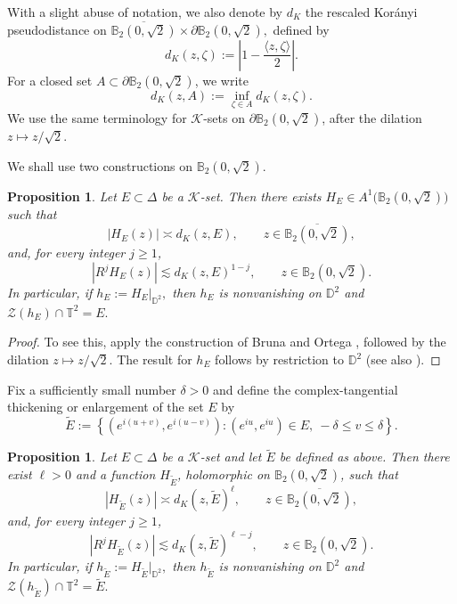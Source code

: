 \documentclass[a4paper,12pt]{amsart}
\newtheorem{prop}[thm]{Proposition}
\theoremstyle{definition}
\begin{document}
With a slight abuse of notation, we also denote by $d_K$ the rescaled
Kor\'anyi pseudodistance on
$
    \overline{\mathbb B_2(0,\sqrt2)}
    \times\partial\mathbb B_2(0,\sqrt2),
$
defined by
\[
    d_K(z,\zeta)
    :=\left|1-\frac{\langle z,\zeta\rangle}{2}\right|.
\]
For a closed set $A\subset\partial\mathbb B_2(0,\sqrt2)$, we write
\[
    d_K(z,A):=\inf_{\zeta\in A}d_K(z,\zeta).
\]
We use the same terminology for $\mathcal K$-sets on
$\partial\mathbb B_2(0,\sqrt2)$, after the dilation
$z\mapsto z/\sqrt2$.

We shall use two constructions on $\mathbb B_2(0,\sqrt2)$.

\begin{prop}\label{prop:ball-construction-E}
Let $E\subset\Delta$ be a $\mathcal K$-set. Then there exists
$H_E\in A^1\bigl(\mathbb B_2(0,\sqrt2)\bigr)$
such that
\[
    |H_E(z)|\asymp d_K(z,E),
    \qquad z\in\overline{\mathbb B_2(0,\sqrt2)},
\]
and, for every integer $j\geq1$,
\[
    |R^jH_E(z)|
    \lesssim d_K(z,E)^{1-j},
    \qquad z\in\mathbb B_2(0,\sqrt2).
\]
In particular, if
$h_E:=H_E|_{\mathbb D^2},$
then $h_E$ is nonvanishing on $\mathbb D^2$ and
$ \mathcal Z(h_E)\cap\mathbb T^2=E.$
\end{prop}

\begin{proof} To see this, apply the construction of Bruna and Ortega
\cite[Theorem~4.3]{Bruna1986}, followed by the dilation
$z\mapsto z/\sqrt2$. The result for $h_E$ follows by restriction to
$\mathbb D^2$ (see also \cite[Proposition~1]{Pouriya_CriticalBall}).
\end{proof}

Fix a sufficiently small number $\delta>0$ and define the
complex-tangential thickening or enlargement of the set $E$ by
\[
    \widetilde E
    :=\left\{
       (e^{i(u+v)},e^{i(u-v)}):
       (e^{iu},e^{iu})\in E,\ -\delta\leq v\leq\delta
      \right\}.
\]

\begin{prop}\label{prop:ball-construction-Etilde}
Let $E\subset\Delta$ be a $\mathcal K$-set and let $\widetilde E$ be
defined as above. Then there exist $\ell>0$ and a function
$H_{\widetilde E}$, holomorphic on $\mathbb B_2(0,\sqrt2)$, such that
\[
    |H_{\widetilde E}(z)|
    \asymp d_K(z,\widetilde E)^\ell,
    \qquad z\in\overline{\mathbb B_2(0,\sqrt2)},
\]
and, for every integer $j\geq1$,
\[
    |R^jH_{\widetilde E}(z)|
    \lesssim d_K(z,\widetilde E)^{\ell-j},
    \qquad z\in\mathbb B_2(0,\sqrt2).
\]
In particular, if
$
    h_{\widetilde E}
    :=H_{\widetilde E}|_{\mathbb D^2},
$
then $h_{\widetilde E}$ is nonvanishing on $\mathbb D^2$ and
$
    \mathcal Z(h_{\widetilde E})\cap\mathbb T^2=\widetilde E.
$
\end{prop}
\end{document}
